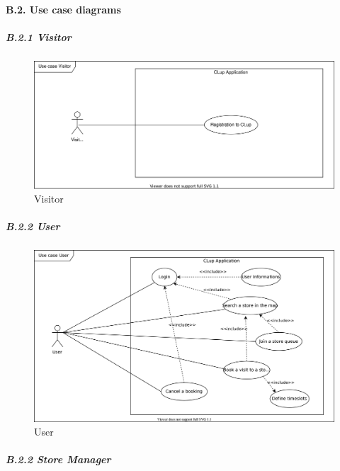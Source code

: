 \documentclass[
]{article}
\begin{document}
\hypertarget{b.2.-use-case-diagrams}{%
\paragraph{B.2. Use case diagrams}\label{b.2.-use-case-diagrams}}

\hypertarget{b.2.1-visitor}{%
\subparagraph{\texorpdfstring{B.2.1 Visitor
}{B.2.1 Visitor }}\label{b.2.1-visitor}}

\begin{figure}
\centering
\includegraphics{assets/rasd/use_cases/use_case_visitor_registration.jpg}
\caption{Visitor}
\end{figure}

\hypertarget{b.2.2-user}{%
\subparagraph{\texorpdfstring{B.2.2 User
}{B.2.2 User }}\label{b.2.2-user}}

\begin{figure}
\centering
\includegraphics{assets/rasd/use_cases/use_case_user.jpg}
\caption{User}
\end{figure}

\hypertarget{b.2.2-store-manager}{%
\subparagraph{\texorpdfstring{B.2.2 Store Manager
}{B.2.2 Store Manager }}\label{b.2.2-store-manager}}
\end{document}
